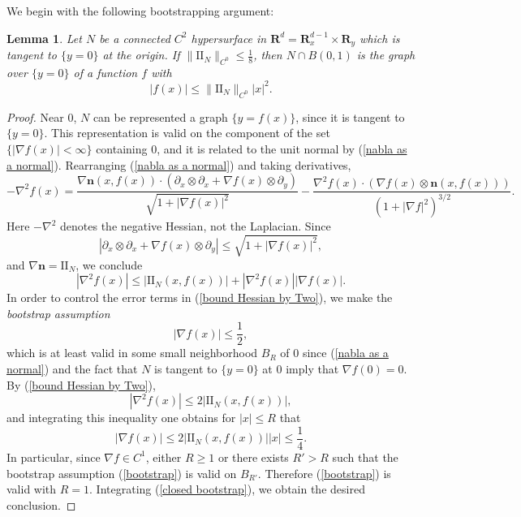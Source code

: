 \documentclass[reqno,11pt]{amsart}
\newcommand{\RR}{\mathbf{R}}
\newcommand{\Two}{\mathrm{I\!I}}
\newcommand{\normal}{\mathbf n}
\newcommand{\dfn}[1]{\emph{#1}\index{#1}}
\newtheorem{lemma}[theorem]{Lemma}
\theoremstyle{definition}
\numberwithin{equation}{section}
\begin{document}
We begin with the following bootstrapping argument:

\begin{lemma}\label{existence of tubes}
	Let $N$ be a connected $C^2$ hypersurface in $\RR^d = \RR^{d - 1}_x \times \RR_y$ which is tangent to $\{y = 0\}$ at the origin.
	If $\|\Two_N\|_{C^0} \leq \frac{1}{8}$, then $N \cap B(0, 1)$ is the graph over $\{y = 0\}$ of a function $f$ with
	$$|f(x)| \leq \|\Two_N\|_{C^0} |x|^2.$$
\end{lemma}
\begin{proof}
	Near $0$, $N$ can be represented a graph $\{y = f(x)\}$, since it is tangent to $\{y = 0\}$.
	This representation is valid on the component of the set $\{|\nabla f(x)| < \infty\}$ containing $0$, and it is related to the unit normal by (\ref{nabla as a normal}).
	Rearranging (\ref{nabla as a normal}) and taking derivatives,
	$$-\nabla^2 f(x) = \frac{\nabla \normal(x, f(x)) \cdot (\partial_x \otimes \partial_x + \nabla f(x) \otimes \partial_y)}{\sqrt{1 + |\nabla f(x)|^2}} - \frac{\nabla^2 f(x) \cdot (\nabla f(x) \otimes \normal(x, f(x)))}{(1 + |\nabla f|^2)^{3/2}}.$$
	Here $-\nabla^2$ denotes the negative Hessian, not the Laplacian.
	Since
	$$|\partial_x \otimes \partial_x + \nabla f(x) \otimes \partial_y| \leq \sqrt{1 + |\nabla f(x)|^2},$$
	and $\nabla \normal = \Two_N$, we conclude
\begin{equation}\label{bound Hessian by Two}
	|\nabla^2 f(x)| \leq |\Two_N(x, f(x))| + |\nabla^2 f(x)| |\nabla f(x)|.
\end{equation}
	In order to control the error terms in (\ref{bound Hessian by Two}), we make the \dfn{bootstrap assumption}
\begin{equation}\label{bootstrap}
	|\nabla f(x)| \leq \frac{1}{2},
\end{equation}
	which is at least valid in some small neighborhood $B_R$ of $0$ since (\ref{nabla as a normal}) and the fact that $N$ is tangent to $\{y = 0\}$ at $0$ imply that $\nabla f(0) = 0$.
	By (\ref{bound Hessian by Two}),
$$|\nabla^2 f(x)| \leq 2|\Two_N(x, f(x))|,$$
	and integrating this inequality one obtains for $|x| \leq R$ that
\begin{equation}\label{closed bootstrap}
	|\nabla f(x)| \leq 2|\Two_N(x, f(x))| |x| \leq \frac{1}{4}.
\end{equation}
	In particular, since $\nabla f \in C^1$, either $R \geq 1$ or there exists $R' > R$ such that the bootstrap assumption (\ref{bootstrap}) is valid on $B_{R'}$.
	Therefore (\ref{bootstrap}) is valid with $R = 1$.
	Integrating (\ref{closed bootstrap}), we obtain the desired conclusion.
\end{proof}
\end{document}
